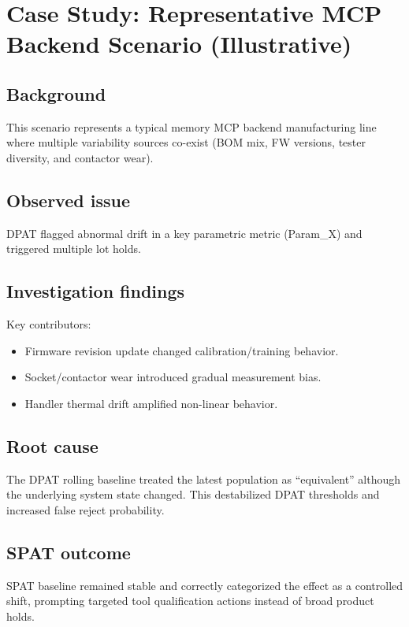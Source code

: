 \documentclass[11pt,a4paper]{article}
\begin{document}
	\section{Case Study: Representative MCP Backend Scenario (Illustrative)}
	
	\subsection{Background}
	This scenario represents a typical memory MCP backend manufacturing line where multiple variability sources
	co-exist (BOM mix, FW versions, tester diversity, and contactor wear).
	
	\subsection{Observed issue}
	DPAT flagged abnormal drift in a key parametric metric (Param\_X) and triggered multiple lot holds.
	
	\subsection{Investigation findings}
	Key contributors:
	\begin{itemize}[leftmargin=1.2em]
		\item Firmware revision update changed calibration/training behavior.
		\item Socket/contactor wear introduced gradual measurement bias.
		\item Handler thermal drift amplified non-linear behavior.
	\end{itemize}
	
	\subsection{Root cause}
	The DPAT rolling baseline treated the latest population as “equivalent” although the
	underlying system state changed. This destabilized DPAT thresholds and increased false reject probability.
	
	\subsection{SPAT outcome}
	SPAT baseline remained stable and correctly categorized the effect as a controlled shift, prompting
	targeted tool qualification actions instead of broad product holds.
	
\end{document}
